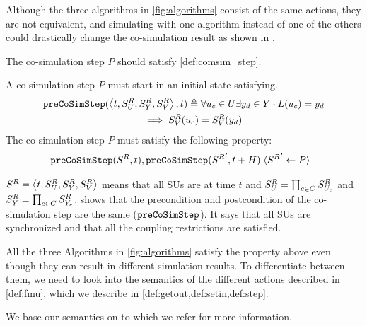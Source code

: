 Although the three algorithms in \cref{fig:algorithms} consist of the same actions, they are not equivalent, and simulating with one algorithm instead of one of the others could drastically change the co-simulation result as shown in \cite{Gomes2019c,hansen_verification_2021}. 

The co-simulation step $P$ should satisfy \cref{def:comsim_step}.

\begin{definition}\label{def:comsim_step}
  A co-simulation step $P$ must start in an initial state satisfying.
  \begin{align}
    &\mathtt{preCoSimStep}( \left\langle t,S^{R}_{U}, S^{R}_{Y},S^{R}_{V} \right\rangle , t) \triangleq 
    \forall u_{c} \in U
    \exists y_{d} \in Y
    \cdot L(u_{c}) = y_{d}  \nonumber \\
    &\qquad \qquad \qquad \qquad \qquad \implies
    S^{R}_{V}(u_{c}) = S^{R}_{V}(y_{d})
  \end{align}
  The co-simulation step $P$ must satisfy the following property: 
  \begin{align}
    &[\mathtt{preCoSimStep}(S^{R}_{}, t), 
    \mathtt{preCoSimStep}({S^{R}_{}}', t+H)] 
    \langle {S^{R}_{}}' \gets P\rangle
  \end{align}
\end{definition}

$S^{R}_{} =  \left\langle t, S^{R}_{U}, S^{R}_{Y}, S^{R}_{V} \right\rangle $ means that all SUs are at time $t$ and $S^{R}_{U} = \prod_{c \in C}S^{R}_{U_{c}}$ and $S^{R}_{Y} = \prod_{c \in C}S^{R}_{Y_{c}}$.
 shows that the precondition and postcondition of the co-simulation step are the same ($\mathtt{preCoSimStep}$).
It says that all SUs are synchronized and that all the coupling restrictions are satisfied.

All the three Algorithms in \cref{fig:algorithms} satisfy the property above even though they can result in different simulation results.
To differentiate between them, we need to look into the semantics of the different actions described in \cref{def:fmu}, which we describe in \cref{def:getout,def:setin,def:step}.

We base our semantics on \cite{Gomes2019a,hansen_verification_2021} to which we refer for more information.

